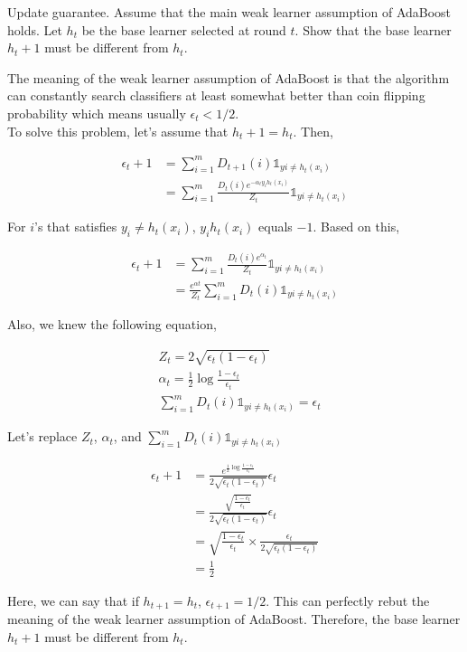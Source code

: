 \documentclass[12pt,letterpaper,boxed]{hmcpset}
\begin{document}
\begin{problem}[Problem 6.3]
Update guarantee. Assume that the main weak learner assumption of AdaBoost holds. Let $h_t$ be the base learner selected at round $t$. Show that the base learner $h_t+1$ must be different from $h_t$.
\end{problem}

\begin{solution}

The meaning of the weak learner assumption of AdaBoost is that the algorithm can constantly search classifiers at least somewhat better than coin flipping probability which means usually  $\epsilon_t < 1/2$.
\\

To solve this problem, let's assume that $h_t+1 = h_t$. Then,

\begin{align*}
  \epsilon_t+1 
  &= \sum^{m}_{i=1} D_{t+1}(i)\mathbb{1}_{yi \neq h_t(x_i)} \\
  &=\sum^{m}_{i=1} \frac{D_{t}(i)e^{-\alpha_ty_ih_t(x_i)}}{Z_t}\mathbb{1}_{yi \neq h_t(x_i)}
\end{align*}

For $i$'s that satisfies $y_i \neq h_t(x_i)$, $y_i h_t(x_i)$ equals $-1$. Based on this,

\begin{align*}
  \epsilon_t+1
  &=\sum^{m}_{i=1} \frac{D_{t}(i)e^{\alpha_t}}{Z_t}\mathbb{1}_{yi \neq h_t(x_i)} \\
  &= \frac{e^{\alpha t}}{Z_t}\sum^{m}_{i=1} D_{t}(i)\mathbb{1}_{yi \neq h_t(x_i)}
\end{align*}

Also, we knew the following equation,

\begin{align*}
  & Z_t = 2\sqrt{\epsilon_t(1-\epsilon_t)} \\
  & \alpha_t = \frac{1}{2}\log\frac{1-\epsilon_t}{\epsilon_t} \\
  & \sum^{m}_{i=1} D_{t}(i)\mathbb{1}_{yi \neq h_t(x_i)} = \epsilon_t
\end{align*}

Let's replace $Z_t$, $\alpha_t$, and $\sum^{m}_{i=1} D_{t}(i)\mathbb{1}_{yi \neq h_t(x_i)}$

\begin{align*}
  \epsilon_t+1
  &= \frac{e^{\frac{1}{2}\log\frac{1-\epsilon_t}{\epsilon_t}}}{2\sqrt{\epsilon_t(1-\epsilon_t)}}\epsilon_t \\
  &= \frac{\sqrt{\frac{1-\epsilon_t}{\epsilon_t}}}{2\sqrt{\epsilon_t(1-\epsilon_t)}}\epsilon_t \\
  &= \sqrt{\frac{1-\epsilon_t}{\epsilon_t}} \times \frac{\epsilon_t}{2\sqrt{\epsilon_t(1-\epsilon_t)}} \\
  &= \frac{1}{2}
\end{align*}

Here, we can say that if $h_{t+1} = h_t$, $\epsilon_{t+1} = 1/2$. This can perfectly rebut the meaning of the weak learner assumption of AdaBoost. Therefore, the base learner $h_t+1$ must be different from $h_t$.

\end{solution}
\end{document}
